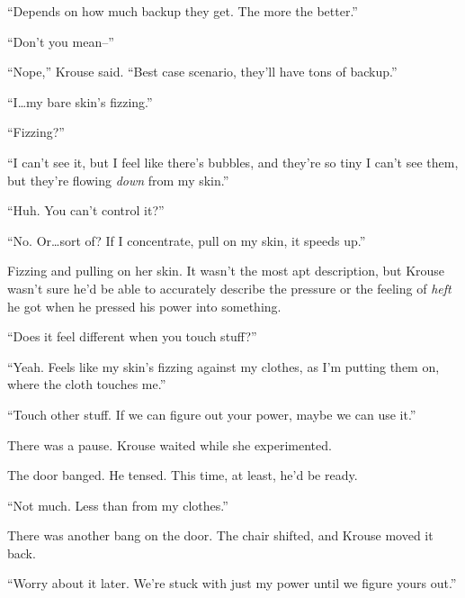 ``Depends on how much backup they get.  The more the better.''



``Don't you mean--''



``Nope,'' Krouse said.  ``Best case scenario, they'll have tons of backup.''



``I\ldots my bare skin's fizzing.''



``Fizzing?''



``I can't see it, but I feel like there's bubbles, and they're so tiny I can't see them, but they're flowing \emph{down} from my skin.''



``Huh.  You can't control it?''



``No.  Or\ldots sort of?  If I concentrate, pull on my skin, it speeds up.''



Fizzing and pulling on her skin.  It wasn't the most apt description, but Krouse wasn't sure he'd be able to accurately describe the pressure or the feeling of \emph{heft} he got when he pressed his power into something.



``Does it feel different when you touch stuff?''



``Yeah.  Feels like my skin's fizzing against my clothes, as I'm putting them on, where the cloth touches me.''



``Touch other stuff.  If we can figure out your power, maybe we can use it.''



There was a pause.  Krouse waited while she experimented.



The door banged.  He tensed.  This time, at least, he'd be ready.



``Not much.  Less than from my clothes.''



There was another bang on the door.  The chair shifted, and Krouse moved it back.



``Worry about it later.  We're stuck with just my power until we figure yours out.''



